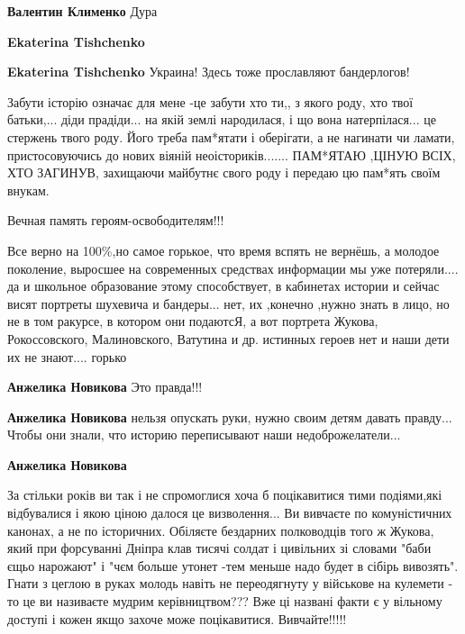 \begin{itemize}
\begin{itemize}
\textbf{Валентин Клименко} Дура

\textbf{Ekaterina Tishchenko}

\textbf{Ekaterina Tishchenko} Украина! Здесь тоже прославляют бандерлогов!

\end{itemize} %


Забути історію означає для мене -це забути хто ти,, з якого роду, хто твої
батьки,... діди прадіди... на якій землі народилася, і що вона натерпілася... це
стержень твого роду. Його треба пам*ятати і оберігати, а не нагинати чи ламати,
пристосовуючись до нових віяній неоісториків....... ПАМ*ЯТАЮ ,ЦІНУЮ ВСІХ, ХТО
ЗАГИНУВ, захищаючи майбутнє свого роду і передаю цю пам*ять своїм внукам.


Вечная память героям-освободителям!!!

Все верно на 100\%,но самое горькое, что время вспять не вернёшь, а молодое
поколение, выросшее на современных средствах информации мы уже потеряли.... да и
школьное образование этому способствует, в кабинетах истории и сейчас висят
портреты шухевича и бандеры... нет, их ,конечно ,нужно знать в лицо, но не в том
ракурсе, в котором они подаютсЯ, а вот портрета
Жукова, Рокоссовского, Малиновского, Ватутина и др. истинных героев нет и наши дети
их не знают.... горько

\begin{itemize} %
\textbf{Анжелика Новикова} Это правда!!!

\textbf{Анжелика Новикова} нельзя опускать руки, нужно своим детям давать правду... Чтобы они знали, что историю переписывают наши недоброжелатели...

\textbf{Анжелика Новикова} 

За стільки років ви так і не спромоглися хоча б поцікавитися тими подіями,які
відбувалися і якою ціною далося це визволення... Ви вивчаєте по комуністичних
канонах, а не по історичних. Обіляєте бездарних полководців того ж Жукова, який
при форсуванні Дніпра клав тисячі солдат і цивільних зі словами "баби єщьо
нарожают" і "чєм больше утонет -тем меньше надо будет в сібірь вивозять". Гнати
з цеглою в руках молодь навіть не переодягнуту у військове на кулемети - то це
ви називаєте мудрим керівництвом??? Вже ці названі факти є у вільному доступі і
кожен якщо захоче може поцікавитися. Вивчайте!!!!!


\end{itemize}
\end{itemize}
